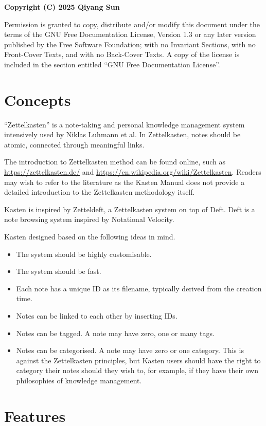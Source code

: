 \documentclass{book}
\renewcommand{\_}{\Texinfounderscore\discretionary{}{}{}}
\begin{document}
\textbf{Copyright (C) 2025 Qiyang Sun}

Permission is granted to copy, distribute and/or modify this document under the
terms of the GNU Free Documentation License, Version 1.3 or any later version
published by the Free Software Foundation; with no Invariant Sections, with no
Front-Cover Texts, and with no Back-Cover Texts.  A copy of the license is
included in the section entitled ``GNU Free Documentation License''.

\chapter{{Concepts}}
\label{anchor:Concepts}%

``Zettelkasten'' is a note-taking and personal knowledge management system
intensively used by Niklas Luhmann et al.  In Zettelkasten, notes should be
atomic, connected through meaningful links.

The introduction to Zettelkasten method can be found online, such as
\url{https://zettelkasten.de/} and \url{https://en.wikipedia.org/wiki/Zettelkasten}.
Readers may wish to refer to the literature as the Kasten Manual does not
provide a detailed introduction to the Zettelkasten methodology itself.

Kasten is inspired by Zetteldeft, a Zettelkasten system on top of Deft.  Deft is
a note browsing system inspired by Notational Velocity.

Kasten designed based on the following ideas in mind.
\begin{itemize}
\item The system should be highly customisable.
\item The system should be fast.
\item Each note has a unique ID as its filename, typically derived from the creation
time.
\item Notes can be linked to each other by inserting IDs.
\item Notes can be tagged.  A note may have zero, one or many tags.
\item Notes can be categorised.  A note may have zero or one category.  This is
against the Zettelkasten principles, but Kasten users should have the right to
category their notes should they wish to, for example, if they have their own
philosophies of knowledge management.
\end{itemize}

\chapter{{Features}}
\label{anchor:Features}%
\end{document}
